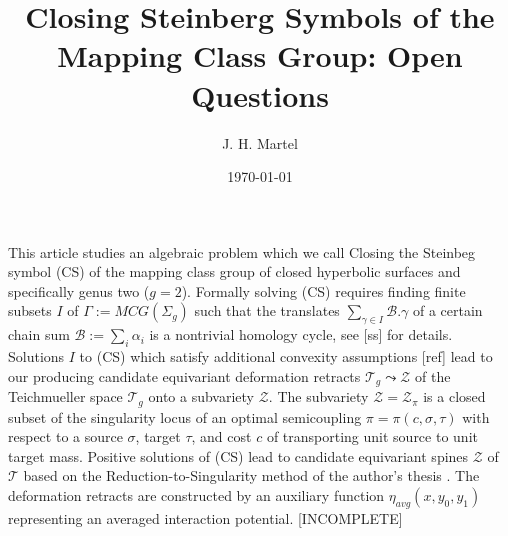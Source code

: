 \documentclass[12pt]{amsart}
\theoremstyle{definition}
\theoremstyle{remark}
\newcommand{\sB}{\mathscr{B}}
\newcommand{\sT}{\mathscr{T}}
\newcommand{\sZ}{\mathscr{Z}}
\begin{document}
\title{Closing Steinberg Symbols of the Mapping Class Group: Open Questions}
\author{J. H. Martel}
\date{\today}

\maketitle

This article studies an algebraic problem which we call Closing the Steinbeg symbol (CS) of the mapping class group of closed hyperbolic surfaces and specifically genus two ($g=2$). Formally solving (CS) requires finding finite subsets $I$ of $\Gamma:=MCG(\Sigma_g)$ such that the translates $\sum_{\gamma \in I}\sB.\gamma$ of a certain chain sum $\sB:=\sum_i \alpha_i$ is a nontrivial homology cycle, see [ss] for details. Solutions $I$ to (CS) which satisfy additional convexity assumptions [ref] lead to our producing candidate equivariant deformation retracts $\sT_g \leadsto \sZ$ of the Teichmueller space $\sT_g$ onto a subvariety $\sZ$. The subvariety $\sZ=\sZ_\pi$ is a closed subset of the singularity locus of an optimal semicoupling $\pi=\pi(c,\sigma, \tau)$ with respect to a source $\sigma$, target $\tau$, and cost $c$ of transporting unit source to unit target mass. Positive solutions of (CS) lead to candidate equivariant spines $\sZ$ of $\sT$ based on the Reduction-to-Singularity method of the author's thesis \cite{martel}. The deformation retracts are constructed by an auxiliary function $\eta_{avg}(x,y_0, y_1)$ representing an averaged interaction potential. [INCOMPLETE]





\end{document}
